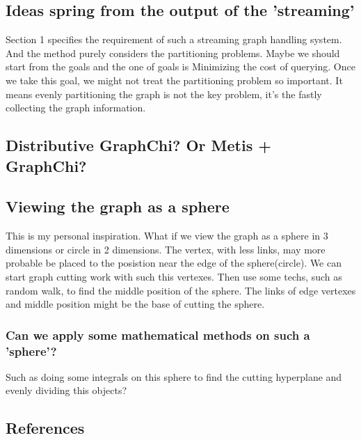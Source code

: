 \documentclass{article}
\begin{document}
	\subsection{Ideas spring from the output of the 'streaming'}
	Section 1 specifies the requirement of such a streaming graph handling system. And the method\cite{stanton2012streaming} purely considers the partitioning problems. Maybe we should start from the goals and the one of goals is Minimizing the cost of querying. Once we take this goal, we might not treat the partitioning problem so important. It means evenly partitioning the graph is not the key problem, it's the fastly collecting the graph information.

	\subsection{Distributive GraphChi? Or Metis + GraphChi?}

	\subsection{Viewing the graph as a sphere}
	This is my personal inspiration. What if we view the graph as a sphere in 3 dimensions or circle in 2 dimensions. The vertex, with less links, may more probable be placed to the posistion near the edge of the sphere(circle). We can start graph cutting work with such this vertexes. Then use some techs, such as random walk, to find the middle position of the sphere. The links of edge vertexes and middle position might be the base of cutting the sphere.
	\subsubsection{Can we apply some mathematical methods on such a 'sphere'?}
	Such as doing some integrals on this sphere to find the cutting hyperplane and evenly dividing this objects?

	\newpage
	\begin{appendix}
		\section{References}
		
		
	\end{appendix}
\end{document}
